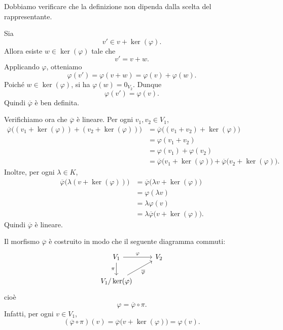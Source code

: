 \documentclass[a4paper]{article}
\begin{document}
\begin{radioactive}
\begin{snippetproof}{}
    Dobbiamo verificare che la definizione non dipenda dalla scelta del rappresentante.

    Sia
    \[
        v' \in v+\ker(\varphi).
    \]
    Allora esiste \(w \in \ker(\varphi)\) tale che
    \[
        v'=v+w.
    \]
    Applicando \(\varphi\), otteniamo
    \[
        \varphi(v')
        =
        \varphi(v+w)
        =
        \varphi(v)+\varphi(w).
    \]
    Poiché \(w \in \ker(\varphi)\), si ha \(\varphi(w)=0_{V_2}\). Dunque
    \[
        \varphi(v')=\varphi(v).
    \]
    Quindi \(\overline{\varphi}\) è ben definita.

    Verifichiamo ora che \(\overline{\varphi}\) è lineare.
    Per ogni \(v_1,v_2 \in V_1\),
    \begin{align*}
        \overline{\varphi}\big((v_1+\ker(\varphi))+(v_2+\ker(\varphi))\big)
        &=
        \overline{\varphi}\big((v_1+v_2)+\ker(\varphi)\big) \\
        &=
        \varphi(v_1+v_2) \\
        &=
        \varphi(v_1)+\varphi(v_2) \\
        &=
        \overline{\varphi}\big(v_1+\ker(\varphi)\big)
        +
        \overline{\varphi}\big(v_2+\ker(\varphi)\big).
    \end{align*}
    Inoltre, per ogni \(\lambda \in K\),
    \begin{align*}
        \overline{\varphi}\big(\lambda(v+\ker(\varphi))\big)
        &=
        \overline{\varphi}\big(\lambda v+\ker(\varphi)\big) \\
        &=
        \varphi(\lambda v) \\
        &=
        \lambda\varphi(v) \\
        &=
        \lambda\overline{\varphi}\big(v+\ker(\varphi)\big).
    \end{align*}
    Quindi \(\overline{\varphi}\) è lineare.
\end{snippetproof}
\end{radioactive}

\begin{radioactive}
Il morfismo \(\overline{\varphi}\) è costruito in modo che il seguente diagramma commuti:
\[
    \begin{tikzcd}
        V_1 \arrow[r, "\varphi"] \arrow[d, "\pi"'] & V_2 \\
        V_1/\ker(\varphi) \arrow[ur, "\overline{\varphi}"']
    \end{tikzcd}
\]
cioè
\[
    \varphi=\overline{\varphi}\circ \pi.
\]
Infatti, per ogni \(v \in V_1\),
\[
    (\overline{\varphi}\circ \pi)(v)
    =
    \overline{\varphi}\big(v+\ker(\varphi)\big)
    =
    \varphi(v).
\]
\end{radioactive}
\end{document}
